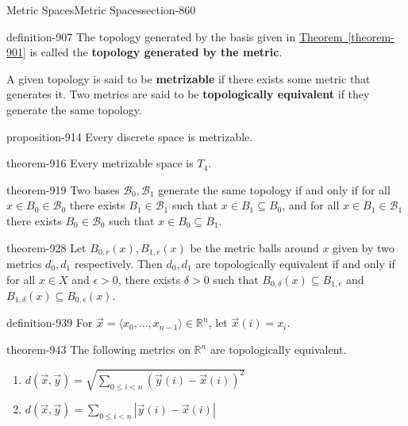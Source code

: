 \documentclass[oneside,10pt,]{article}
\newcommand{\terminology}[1]{\textbf{#1}}
\newcommand{\tuple}[1]{\langle #1 \rangle}
\newcommand{\mb}{\mathbb}
\newcommand{\mc}{\mathcal}
\newcommand{\lt}{<}
\newcommand{\gt}{>}
\begin{document}
\begin{sectionptx}{Metric Spaces}{}{Metric Spaces}{}{}{section-860}
\begin{definition}{}{definition-907}%
\hypertarget{p-908}{}%
The topology generated by the basis given in \hyperref[theorem-901]{Theorem~\ref{theorem-901}} is called the \terminology{topology generated by the metric}.%
\par
\hypertarget{p-911}{}%
A given topology is said to be \terminology{metrizable} if there exists some metric that generates it. Two metrics are said to be \terminology{topologically equivalent} if they generate the same topology.%
\end{definition}
\begin{proposition}{}{}{proposition-914}%
\hypertarget{p-915}{}%
Every discrete space is metrizable.%
\end{proposition}
\begin{theorem}{}{}{theorem-916}%
\hypertarget{p-917}{}%
Every metrizable space is \(T_4\).%
\end{theorem}
\begin{theorem}{}{}{theorem-919}%
\hypertarget{p-920}{}%
Two bases \(\mc B_0,\mc B_1\) generate the same topology if and only if for all \(x\in B_0\in\mc B_0\) there exists \(B_1\in\mc B_1\) such that \(x\in B_1\subseteq B_0\), and for all \(x\in B_1\in\mc B_1\) there exists \(B_0\in\mc B_0\) such that \(x\in B_0\subseteq B_1\). %
\end{theorem}
\begin{theorem}{}{}{theorem-928}%
\hypertarget{p-929}{}%
Let \(B_{0,r}(x),B_{1,r}(x)\) be the metric balls around \(x\) given by two metrics \(d_0,d_1\) respectively. Then \(d_0,d_1\) are topologically equivalent if and only if for all \(x\in X\) and \(\epsilon\gt 0\), there exists \(\delta\gt 0\) such that \(B_{0,\delta}(x)\subseteq B_{1,\epsilon}\) and \(B_{1,\delta}(x)\subseteq B_{0,\epsilon}(x)\).%
\end{theorem}
\begin{definition}{}{definition-939}%
\hypertarget{p-940}{}%
For \(\vec x=\tuple{x_0,\dots,x_{n-1}}\in\mb R^n\), let \(\vec x(i)=x_i\).%
\end{definition}
\begin{theorem}{}{}{theorem-943}%
\hypertarget{p-944}{}%
The following metrics on \(\mb R^n\) are topologically equivalent.%
\leavevmode%
\begin{enumerate}
\item\hypertarget{li-947}{}\(d(\vec x,\vec y)=\sqrt{\sum_{0\leq i\lt n}(\vec y(i)-\vec x(i))^2}\)%
\item\hypertarget{li-949}{}\(d(\vec x,\vec y)=\sum_{0\leq i\lt n}|\vec y(i)-\vec x(i)|\)%

\end{enumerate}
\end{theorem}
\end{sectionptx}
\end{document}
